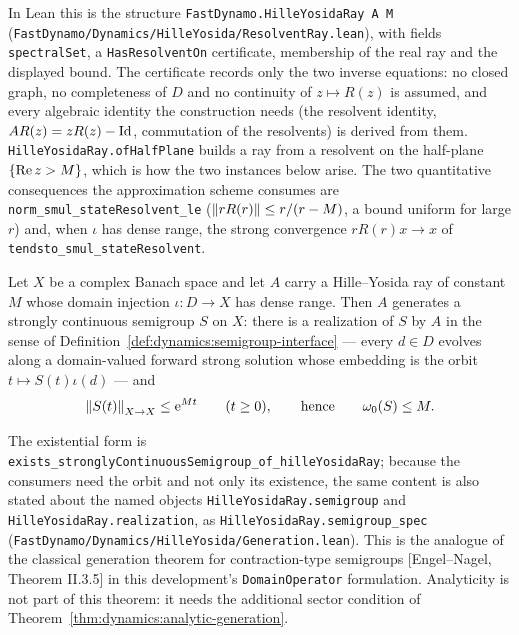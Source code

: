 In Lean this is the structure \texttt{FastDynamo.HilleYosidaRay A M}
(\texttt{FastDynamo/Dynamics/HilleYosida/ResolventRay.lean}), with fields
\texttt{spectralSet}, a \texttt{HasResolventOn} certificate, membership of the real ray and
the displayed bound.  The certificate records only the two inverse equations: no closed
graph, no completeness of $D $ and no continuity of $z\mapsto R(z) $ is assumed, and every
algebraic identity the construction needs (the resolvent identity, $AR(z)=zR(z)-\mathrm{Id} $,
commutation of the resolvents) is derived from them.  \texttt{HilleYosidaRay.ofHalfPlane}
builds a ray from a resolvent on the half-plane $\{\operatorname{Re} z>M\} $, which is how the two
instances below arise.  The two quantitative consequences the approximation scheme consumes
are \texttt{norm\_smul\_stateResolvent\_le} ($\left\|rR(r)\right\|\leq r/(r-M) $, a bound uniform for
large $r $) and, when $\iota $ has dense range, the strong convergence
$rR(r)x\to x $ of \texttt{tendsto\_smul\_stateResolvent}.

\begin{theorem}
  \label{thm:dynamics:hille-yosida}
  \leanok
  Let $X $ be a complex Banach space and let $A $ carry a Hille--Yosida ray of constant $M $
  whose domain injection $\iota:D\to X $ has dense range.  Then $A $ generates a strongly
  continuous semigroup $S $ on $X $: there is a realization of $S $ by $A $ in the sense of
  Definition~\ref{def:dynamics:semigroup-interface} --- every $d\in D $ evolves along a
  domain-valued forward strong solution whose embedding is the orbit $t\mapsto S(t)\iota(d) $
  --- and
  \[
    \left\|S(t)\right\|_{X\to X}\leq\mathrm{e}^{Mt}
    \qquad(t\geq0),
    \qquad\text{hence}\qquad
    \omega_0(S)\leq M .
  \]
\end{theorem}

The existential form is
\texttt{exists\_stronglyContinuousSemigroup\_of\_hilleYosidaRay}; because the consumers need
the orbit and not only its existence, the same content is also stated about the named
objects \texttt{HilleYosidaRay.semigroup} and \texttt{HilleYosidaRay.realization}, as
\texttt{HilleYosidaRay.semigroup\_spec} (\texttt{FastDynamo/Dynamics/HilleYosida/Generation.lean}).
This is the analogue of the classical generation theorem for contraction-type semigroups
[Engel--Nagel, Theorem II.3.5] in this development's \texttt{DomainOperator} formulation.
Analyticity is not part of this theorem: it needs the additional sector condition of
Theorem~\ref{thm:dynamics:analytic-generation}.

